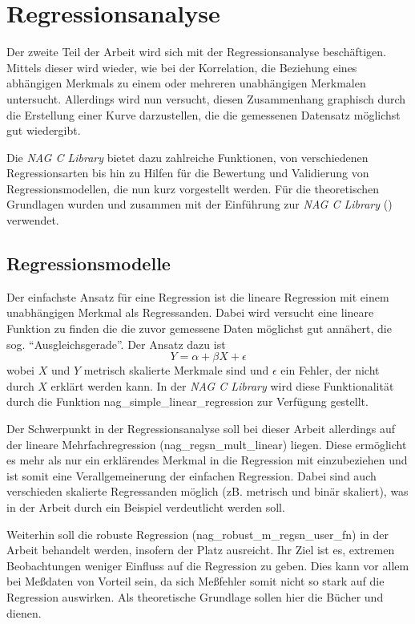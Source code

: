 \documentclass{article}
\begin{document}
\section{Regressionsanalyse}

Der zweite Teil der Arbeit wird sich mit der Regressionsanalyse beschäftigen.
Mittels dieser wird wieder, wie bei der Korrelation, die Beziehung eines abhängigen Merkmals zu einem oder mehreren unabhängigen Merkmalen untersucht.
Allerdings wird nun versucht, diesen Zusammenhang graphisch durch die Erstellung einer Kurve darzustellen, die die gemessenen Datensatz möglichst gut wiedergibt.

Die {\it NAG C Library} bietet dazu zahlreiche Funktionen, von verschiedenen Regressionsarten bis hin zu Hilfen für die Bewertung und Validierung von Regressionsmodellen, die nun kurz vorgestellt werden.
Für die theoretischen Grundlagen wurden \cite{Cramer2007} und \cite{Fahrmeier2010} zusammen mit der Einführung zur {\it NAG C Library} (\cite{nag:intro}) verwendet.

\subsection{Regressionsmodelle}

Der einfachste Ansatz für eine Regression ist die lineare Regression mit einem unabhängigen Merkmal als Regressanden.
Dabei wird versucht eine lineare Funktion zu finden die die zuvor gemessene Daten möglichst gut annähert, die sog. "`Ausgleichsgerade"'.
Der Ansatz dazu ist
\begin{equation*}
 Y = \alpha + \beta X +\epsilon
\end{equation*}
wobei $X$ und $Y$ metrisch skalierte Merkmale sind und $\epsilon$ ein Fehler, der nicht durch $X$ erklärt werden kann.
In der {\it NAG C Library} wird diese Funktionalität durch die Funktion nag\_simple\_linear\_regression zur Verfügung gestellt.

Der Schwerpunkt in der Regressionsanalyse soll bei dieser Arbeit allerdings auf der lineare Mehrfachregression (nag\_regsn\_mult\_linear) liegen.
Diese ermöglicht es mehr als nur ein erklärendes Merkmal in die Regression mit einzubeziehen und ist somit eine Verallgemeinerung der einfachen Regression.
Dabei sind auch verschieden skalierte Regressanden möglich (zB. metrisch und binär skaliert), was in der Arbeit durch ein Beispiel verdeutlicht werden soll.

Weiterhin soll die robuste Regression (nag\_robust\_m\_regsn\_user\_fn) in der Arbeit behandelt werden, insofern der Platz ausreicht.
Ihr Ziel ist es, extremen Beobachtungen weniger Einfluss auf die Regression zu geben.
Dies kann vor allem bei Meßdaten von Vorteil sein, da sich Meßfehler somit nicht so stark auf die Regression auswirken.
Als theoretische Grundlage sollen hier die Bücher \cite{Hampel1986} und \cite{Huber1981} dienen.
\end{document}
